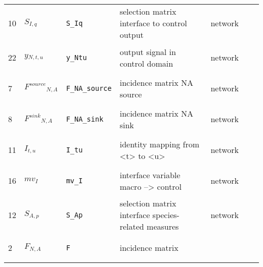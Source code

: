 \begin{longtable}{|p{1cm}|p{2.5cm}|p{4.5cm}|p{8cm}|p{3.0cm}|p{3cm}|p{1cm}|}
            10
             & \hypertarget{"v:10"}{ $ {{S}}{_{I, q}} $}
             & \verb|S_Iq|
             & selection matrix interface to control output
             & \begin{lay}network \end{lay}
             & $  $
             & \\
            22
             & \hypertarget{"v:22"}{ $ {{y}}{_{N, t, u}} $}
             & \verb|y_Ntu|
             & output signal in control domain
             & \begin{lay}network \end{lay}
             & $  $
             & \\
            7
             & \hypertarget{"v:7"}{ $ {{F^{source}}}{_{N, A}} $}
             & \verb|F_NA_source|
             & incidence matrix NA source
             & \begin{lay}network \end{lay}
             & $  $
             & \\
            8
             & \hypertarget{"v:8"}{ $ {{F^{sink}}}{_{N, A}} $}
             & \verb|F_NA_sink|
             & incidence matrix NA sink
             & \begin{lay}network \end{lay}
             & $  $
             & \\
            11
             & \hypertarget{"v:11"}{ $ {{I}}{_{t, u}} $}
             & \verb|I_tu|
             & identity mapping from <t> to <u>
             & \begin{lay}network \end{lay}
             & $  $
             & \\
            16
             & \hypertarget{"v:16"}{ $ {{mv}}{_{I}} $}
             & \verb|mv_I|
             & interface variable macro --> control
             & \begin{lay}network \end{lay}
             & $  $
             & \\
            12
             & \hypertarget{"v:12"}{ $ {{S}}{_{A, p}} $}
             & \verb|S_Ap|
             & selection matrix interface species-related measures
             & \begin{lay}network \end{lay}
             & $  $
             & \\
            2
             & \hypertarget{"v:2"}{ $ {{F}}{_{N, A}} $}
             & \verb|F|
             & incidence matrix

\end{longtable}
